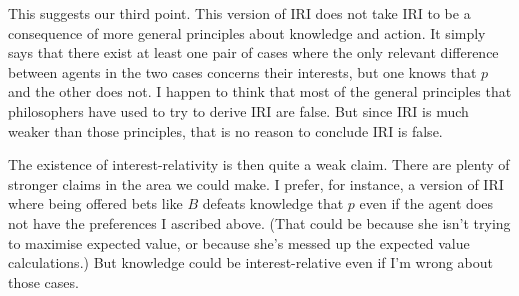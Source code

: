 \documentclass[oneside]{book}
\begin{document}
%
%

This suggests our third point. This version of IRI does not take IRI to be a consequence of more general principles about knowledge and action. It simply says that there exist at least one pair of cases where the only relevant difference between agents in the two cases concerns their interests, but one knows that $p$ and the other does not. I happen to think that most of the general principles that philosophers have used to try to derive IRI are false. But since IRI is much weaker than those principles, that is no reason to conclude IRI is false.

The existence of interest-relativity is then quite a weak claim. There are plenty of stronger claims in the area we could make. I prefer, for instance, a version of IRI where being offered bets like $B$ defeats knowledge that $p$ even if the agent does not have the preferences I ascribed above. (That could be because she isn't trying to maximise expected value, or because she's messed up the expected value calculations.) But knowledge could be interest-relative even if I'm wrong about those cases.
\end{document}
